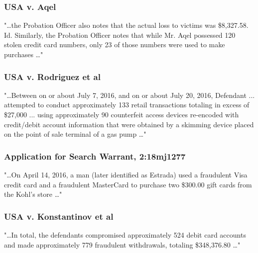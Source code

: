 \subsubsection*{USA v. Aqel \cite{aqel}}
"\dots the Probation Officer also notes that the actual loss to victims
was \$8,327.58. Id. Similarly, the Probation Officer notes that while Mr. Aqel possessed 120 stolen credit
card numbers, only 23 of those numbers were used to make purchases \dots" 

\subsubsection*{USA v. Rodriguez et al \cite{rodriguez}}
"\dots Between on or about July 7, 2016, and on or about July 20, 2016, Defendant ... attempted to conduct approximately 133 retail transactions totaling in excess of \$27,000 ... using approximately 90 counterfeit access devices re-encoded with credit/debit account information that were obtained by a skimming device placed on the point of sale terminal of a gas pump \dots " 

\subsubsection*{Application for Search Warrant, 2:18mj1277\cite{estrada}}
"\dots On April 14, 2016, a man (later identified as Estrada) used a fraudulent Visa credit card and a fraudulent MasterCard to purchase two \$300.00 gift cards from the Kohl's store \dots"

\subsubsection*{USA v. Konstantinov et al \cite{alisuretove}}
"\dots In total, the defendants compromised approximately 524 debit card accounts and made approximately 779 fraudulent withdrawals, totaling \$348,376.80 \dots"

